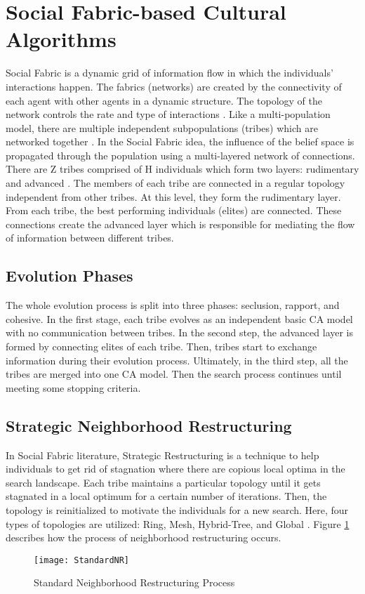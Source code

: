 \section{Social Fabric-based Cultural Algorithms}
Social Fabric is a dynamic grid of information flow in which the individuals' interactions happen. The fabrics (networks) are created by the connectivity of each agent with other agents in a dynamic structure. The topology of the network controls the rate and type of interactions \citet{reynolds2008social}. Like a multi-population model, there are multiple independent subpopulations (tribes) which are networked together \citet{ali2012socio}.\newline
In the Social Fabric idea, the influence of the belief space is propagated through the population using a multi-layered network of connections. There are Z tribes comprised of H individuals which form two layers: rudimentary and advanced \citet{ali2012socio} \citet{ali2016leveraged}. The members of each tribe are connected in a regular topology independent from other tribes. At this level, they form the rudimentary layer. From each tribe, the best performing individuals (elites) are connected. These connections create the advanced layer which is responsible for mediating the flow of information between different tribes.
\subsection{Evolution Phases}The whole evolution process is split into three phases: seclusion, rapport, and cohesive. In the first stage, each tribe evolves as an independent basic CA model with no communication between tribes. In the second step, the advanced layer is formed by connecting elites of each tribe. Then, tribes start to exchange information during their evolution process. Ultimately, in the third step, all the tribes are merged into one CA model. Then the search process continues until meeting some stopping criteria.
\subsection{Strategic Neighborhood Restructuring}In Social Fabric literature, Strategic Restructuring is a technique to help individuals to get rid of stagnation where there are copious local optima in the search landscape. Each tribe maintains a particular topology until it gets stagnated in a local optimum for a certain number of iterations. Then, the topology is reinitialized to motivate the individuals for a new search. Here, four types of topologies are utilized: Ring, Mesh, Hybrid-Tree, and Global \citet{ali2016leveraged}. Figure \ref{fig:StandardNR} describes how the process of neighborhood restructuring occurs.
\begin{figure}[h]
	\texttt{[image: StandardNR]}
	\centering
	\caption{Standard Neighborhood Restructuring Process}
	\label{fig:StandardNR}
\end{figure}
